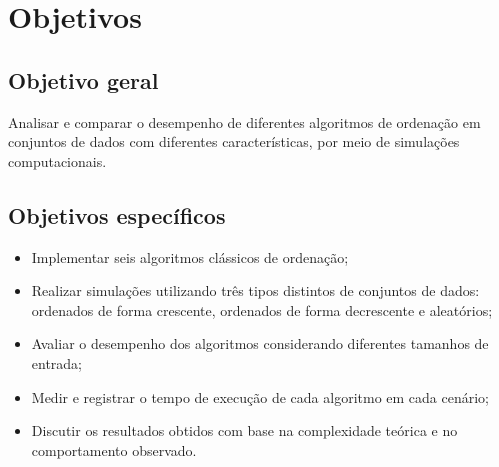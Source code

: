 \section{Objetivos}
    \subsection{Objetivo geral}
    Analisar e comparar o desempenho de diferentes algoritmos de ordenação em conjuntos de dados com diferentes características, por meio de simulações computacionais.
    \subsection{Objetivos específicos}
    \begin{itemize}
        \item Implementar seis algoritmos clássicos de ordenação;
        \item Realizar simulações utilizando três tipos distintos de conjuntos de dados: ordenados de forma crescente, ordenados de forma decrescente e aleatórios;
        \item Avaliar o desempenho dos algoritmos considerando diferentes tamanhos de entrada;
        \item Medir e registrar o tempo de execução de cada algoritmo em cada cenário;
        \item Discutir os resultados obtidos com base na complexidade teórica e no comportamento observado.
    \end{itemize}
